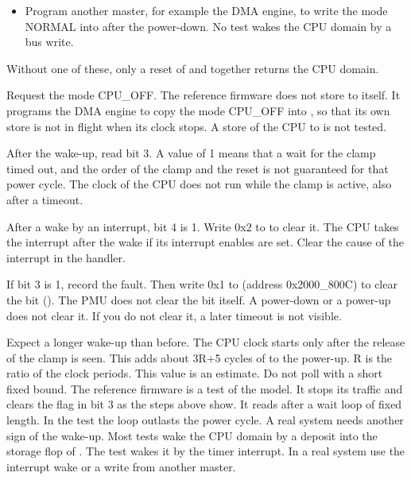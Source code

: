 \begin{procedure}
\begin{itemize}
    \item Program another master, for example the DMA engine, to write the mode NORMAL into  after the power-down. No test wakes the CPU domain by a bus write.
  \end{itemize}
  Without one of these, only a reset of  and  together returns the CPU domain.
  \item Request the mode CPU\_OFF. The reference firmware  does not store to  itself. It programs the DMA engine to copy the mode CPU\_OFF into , so that its own store is not in flight when its clock stops. A store of the CPU to  is not tested.
  \item After the wake-up, read  bit 3. A value of 1 means that a wait for the clamp timed out, and the order of the clamp and the reset is not guaranteed for that power cycle. The clock of the CPU does not run while the clamp is active, also after a timeout.
  \item After a wake by an interrupt,  bit 4 is 1. Write 0x2 to  to clear it. The CPU takes the interrupt after the wake if its interrupt enables are set. Clear the cause of the interrupt in the handler.
  \item If bit 3 is 1, record the fault. Then write 0x1 to  (address 0x2000\_800C) to clear the bit (). The PMU does not clear the bit itself. A power-down or a power-up does not clear it. If you do not clear it, a later timeout is not visible.
\end{procedure}
Expect a longer wake-up than before. The CPU clock starts only after the release of the clamp is seen. This adds about 3R+5 cycles of  to the power-up. R is the ratio of the clock periods. This value is an estimate. Do not poll  with a short fixed bound.
The reference firmware is a test of the model. It stops its traffic and clears the flag in  bit 3 as the steps above show. It reads  after a wait loop of fixed length. In the test the loop outlasts the power cycle. A real system needs another sign of the wake-up. Most tests wake the CPU domain by a deposit into the storage flop of . The test  wakes it by the timer interrupt. In a real system use the interrupt wake or a write from another master.

